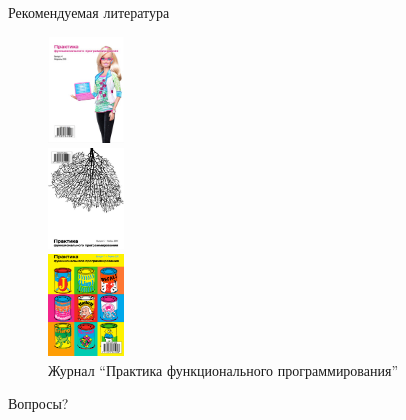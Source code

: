 \documentclass{beamer}
\begin{document}
\begin{frame}{Рекомендуемая литература}
  \begin{figure}
    \begin{minipage}{0.3\linewidth}
      \begin{center}
        \includegraphics[width=20mm]{lecture0/pfp2010-04.eps}
      \end{center}
    \end{minipage}
    \begin{minipage}{0.3\linewidth}
      \begin{center}
        \includegraphics[width=20mm]{lecture0/pfp2010-06.eps}
      \end{center}
    \end{minipage}
    \begin{minipage}{0.3\linewidth}
      \begin{center}
        \includegraphics[width=20mm]{lecture0/pfp2011-07.eps}
      \end{center}
    \end{minipage}
    \caption{Журнал ``Практика функционального программирования''}
  \end{figure}
\end{frame}

\begin{frame}
  \begin{center}
    \LARGE{Вопросы?}
  \end{center}
\end{frame}
\end{document}
